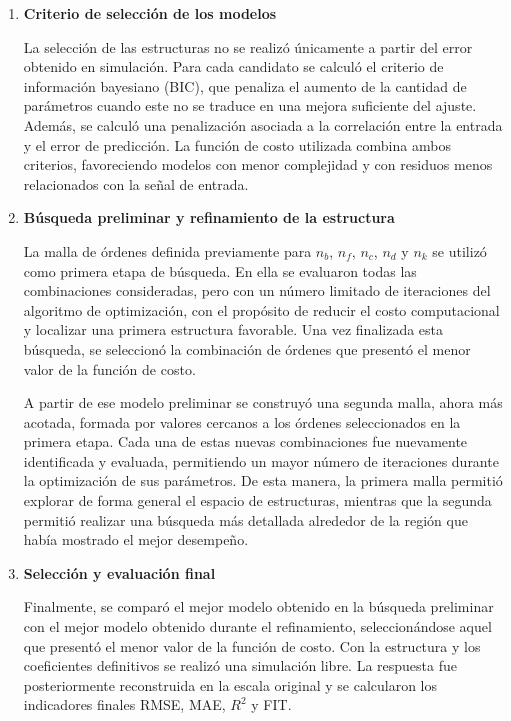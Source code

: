 \documentclass[11pt]{report}
\begin{document}
\begin{enumerate}
 \item \textbf{Criterio de selección de los modelos}

 
La selección de las estructuras no se realizó únicamente a partir del error obtenido en simulación. Para cada candidato se calculó el criterio de información bayesiano (BIC), que penaliza el aumento de la cantidad de parámetros cuando este no se traduce en una mejora suficiente del ajuste. Además, se calculó una penalización asociada a la correlación entre la entrada y el error de predicción. La función de costo utilizada combina ambos criterios, favoreciendo modelos con menor complejidad y con residuos menos relacionados con la señal de entrada.

\item \textbf{Búsqueda preliminar y refinamiento de la estructura}

La malla de órdenes definida previamente para $n_b$, $n_f$, $n_c$, $n_d$ y $n_k$ se utilizó como primera etapa de búsqueda. En ella se evaluaron todas las combinaciones consideradas, pero con un número limitado de iteraciones del algoritmo de optimización, con el propósito de reducir el costo computacional y localizar una primera estructura favorable. Una vez finalizada esta búsqueda, se seleccionó la combinación de órdenes que presentó el menor valor de la función de costo.

A partir de ese modelo preliminar se construyó una segunda malla, ahora más acotada, formada por valores cercanos a los órdenes seleccionados en la primera etapa. Cada una de estas nuevas combinaciones fue nuevamente identificada y evaluada, permitiendo un mayor número de iteraciones durante la optimización de sus parámetros. De esta manera, la primera malla permitió explorar de forma general el espacio de estructuras, mientras que la segunda permitió realizar una búsqueda más detallada alrededor de la región que había mostrado el mejor desempeño.

    \item \textbf{Selección y evaluación final}
    
  Finalmente, se comparó el mejor modelo obtenido en la búsqueda preliminar con el mejor modelo obtenido durante el refinamiento, seleccionándose aquel que presentó el menor valor de la función de costo. Con la estructura y los coeficientes definitivos se realizó una simulación libre. La respuesta fue posteriormente reconstruida en la escala original y se calcularon los indicadores finales RMSE, MAE, $R^2$ y FIT. 
\end{enumerate}
\end{document}
